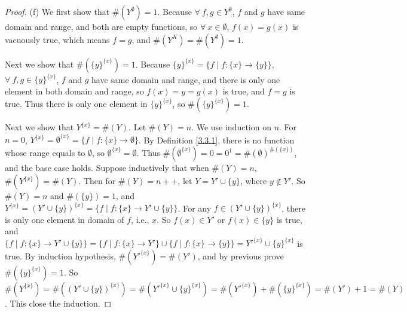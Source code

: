 \begin{proof}{(f)}
    We first show that \(\#(Y^{\emptyset}) = 1\).
    Because \(\forall\ f, g \in Y^{\emptyset}\), \(f\) and \(g\) have same domain and range, and both are empty functions, so \(\forall\ x \in \emptyset\), \(f(x) = g(x)\) is vacuously true, which means \(f = g\), and \(\#(Y^X) = \#(Y^{\emptyset}) = 1\).

    Next we show that \(\#(\{y\}^{\{x\}}) = 1\).
    Because \(\{y\}^{\{x\}} = \{f \mid f : \{x\} \to \{y\}\}\), \(\forall\ f, g \in \{y\}^{\{x\}}\), \(f\) and \(g\) have same domain and range, and there is only one element in both domain and range, so \(f(x) = y = g(x)\) is true, and \(f = g\) is true.
    Thus there is only one element in \(\{y\}^{\{x\}}\), so \(\#(\{y\}^{\{x\}}) = 1\).

    Next we show that \(Y^{\{x\}} = \#(Y)\).
    Let \(\#(Y) = n\).
    We use induction on \(n\).
    For \(n = 0\), \(Y^{\{x\}} = \emptyset^{\{x\}} = \{f \mid f : \{x\} \to \emptyset\}\).
    By Definition \ref{3.3.1}, there is no function whose range equals to \(\emptyset\), so \(\emptyset^{\{x\}} = \emptyset\).
    Thus \(\#(\emptyset^{\{x\}}) = 0 = 0^1 = \#(\emptyset)^{\#(\{x\})}\), and the base case holds.
    Suppose inductively that when \(\#(Y) = n\), \(\#(Y^{\{x\}}) = \#(Y)\).
    Then for \(\#(Y) = n++\), let \(Y = Y' \cup \{y\}\), where \(y \notin Y'\).
    So \(\#(Y) = n\) and \(\#(\{y\}) = 1\), and \(Y^{\{x\}} = (Y' \cup \{y\})^{\{x\}} = \{f \mid f : \{x\} \to Y' \cup \{y\}\}\).
    For any \(f \in (Y' \cup \{y\})^{\{x\}}\), there is only one element in domain of \(f\), i.e., \(x\).
    So \(f(x) \in Y'\) or \(f(x) \in \{y\}\) is true, and \(\{f \mid f : \{x\} \to Y' \cup \{y\}\} = \{f \mid f : \{x\} \to Y'\} \cup \{f \mid f : \{x\} \to \{y\}\} = Y'^{\{x\}} \cup \{y\}^{\{x\}}\) is true.
    By induction hypothesis, \(\#(Y'^{\{x\}}) = \#(Y')\), and by previous prove \(\#(\{y\}^{\{x\}}) = 1\).
    So \(\#(Y^{\{x\}}) = \#((Y' \cup \{y\})^{\{x\}}) = \#(Y'^{\{x\}} \cup \{y\}^{\{x\}}) = \#(Y'^{\{x\}}) + \#(\{y\}^{\{x\}}) = \#(Y') + 1 = \#(Y)\).
    This close the induction.


\end{proof}
